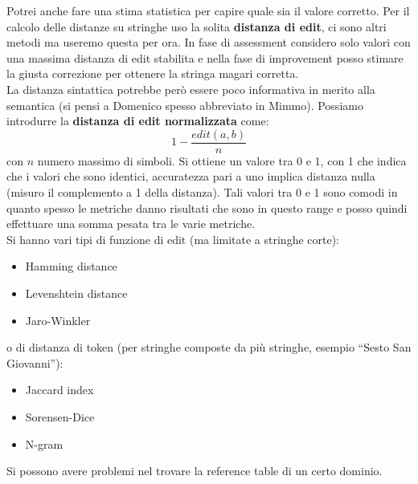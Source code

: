 Potrei anche fare una stima statistica per capire quale sia il valore corretto. Per il calcolo delle distanze su stringhe uso la solita \textbf{distanza di edit}, ci sono altri metodi ma useremo questa per ora. In fase di assessment considero solo valori con una massima distanza di edit stabilita e nella fase di improvement posso stimare la giusta correzione per ottenere la stringa magari corretta. \\

La distanza sintattica potrebbe però essere poco informativa in merito alla semantica (si pensi a Domenico spesso abbreviato in Mimmo). Possiamo introdurre la \textbf{distanza di edit normalizzata} come: \[1-\frac{edit(a,b)}{n}\] con $n$ numero massimo di simboli. Si ottiene un valore tra 0 e 1, con 1 che indica che i valori che sono identici, accuratezza pari a uno implica distanza nulla (misuro il complemento a 1 della distanza). Tali valori tra 0 e 1 sono comodi in quanto spesso le metriche danno risultati che sono in questo range e posso quindi effettuare una somma pesata tra le varie metriche.\\
Si hanno vari tipi di funzione di edit (ma limitate a stringhe corte):
\begin{itemize}
  \item Hamming distance
  \item Levenshtein distance
  \item Jaro-Winkler
\end{itemize}
o di distanza di token (per stringhe composte da più stringhe, esempio ``Sesto San Giovanni''):
\begin{itemize}
  \item Jaccard index
  \item Sorensen-Dice
  \item N-gram
\end{itemize}
Si possono avere problemi nel trovare la reference table di un certo dominio. 
